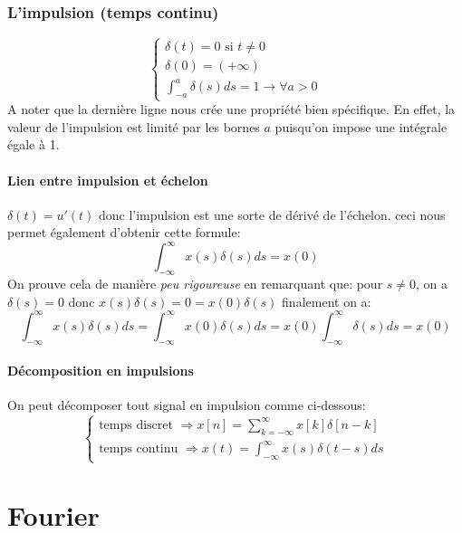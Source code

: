 \documentclass{report}
\begin{document}
\subsection{L'impulsion (temps continu)}
\begin{equation}
\begin{cases}
\delta (t) = 0 \text{ si } t \neq 0\\
\delta (0) = (+\infty)\\
\int_{-a}^a \delta (s) ds = 1 \rightarrow \forall a > 0
\end{cases}
\end{equation}
A noter que la dernière ligne nous crée une propriété bien spécifique. En effet, la valeur de l'impulsion est limité par les bornes $a$ puisqu'on impose une intégrale égale à 1.

\subsubsection{Lien entre impulsion et échelon}
$\delta (t) = u'(t)$ donc l'impulsion est une sorte de dérivé de l'échelon. ceci nous permet également d'obtenir cette formule:
\begin{equation}
\int_{-\infty}^{\infty} x(s) \delta(s)ds = x(0)
\end{equation}
On prouve cela de manière \textit{peu rigoureuse} en remarquant que: pour $s \neq 0$, on a $\delta(s) = 0$ donc $x(s)\delta(s) = 0 = x(0)\delta(s)$ finalement on a:
\begin{equation}
\int_{-\infty}^{\infty} x(s) \delta(s)ds = \int_{-\infty}^{\infty} x(0) \delta(s)ds = x(0) \int_{-\infty}^{\infty} \delta(s)ds = x(0)
\end{equation} 

\subsubsection{Décomposition en impulsions}
On peut décomposer tout signal en impulsion comme ci-dessous:
\begin{equation}
\begin{cases}
\text{temps discret } \Rightarrow x[n] = \sum_{k=-\infty}^{\infty}x[k]\delta[n-k] \\
\text{temps continu } \Rightarrow x(t) = \int_{-\infty}^{\infty} x(s) \delta(t-s)ds
\end{cases}
\end{equation}



\chapter{Fourier}
\end{document}
